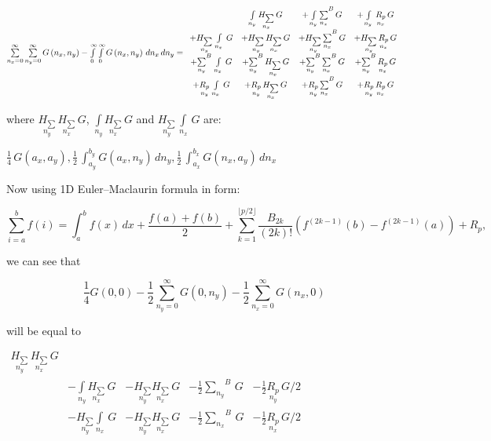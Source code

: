 \documentclass[11pt]{article}
\begin{document}
\(\sum\limits_{n_x=0}^{\infty} \sum\limits_{n_y=0}^{\infty} G\left(n_x, n_y\right) -\int\limits_{0}^{\infty} \int\limits_{0}^{\infty} G\left(n_x, n_y\right)\,d{n_x}\,d{n_y} = \\ \begin{array}{cccc}  \, &  \int\limits_{n_y}^{} \underset{n_x}{H_{\sum}}\,G &  + \int\limits_{n_y}^{}{\sum\limits_{n_x}^{}}^{B}\,G &  + \int\limits_{n_y}^{}\,\underset{n_x}{R_{p}}\,G \\  +\underset{n_y}{H_{\sum}}\,\int\limits_{n_x}^{}\,G &  + \underset{n_y}{H_{\sum}}\,\underset{n_x}{H_{\sum}}\,G &  + \underset{n_y}{H_{\sum}}\,{\sum\limits_{n_x}^{}}^{B}\,G &  + \underset{n_y}{H_{\sum}}\,\underset{n_x}{R_{p}}\,G \\  + {\sum\limits_{n_y}^{}}^{B}\,\int\limits_{n_x}^{}\,G &  + {\sum\limits_{n_y}^{}}^{B}\,\underset{n_x}{H_{\sum}}\,G &  + {\sum\limits_{n_y}^{}}^{B}\,{\sum\limits_{n_x}^{}}^{B}\,G &  + {\sum\limits_{n_y}^{}}^{B}\,\underset{n_x}{R_{p}}\,G \\  + \underset{n_y}{R_{p}}\,\int\limits_{n_x}^{}\,G &  + \underset{n_y}{R_{p}}\,\underset{n_x}{H_{\sum}}\,G &  + \underset{n_y}{R_{p}}\,{\sum\limits_{n_x}^{}}^{B}\,G &  + \underset{n_y}{R_{p}}\,\underset{n_x}{R_{p}}\,G \end{array}\)

    where \(\underset{n_y}{H_{\sum}}\,\underset{n_x}{H_{\sum}}\,G\),
\(\int\limits_{n_y}^{} \underset{n_x}{H_{\sum}}\,G\) and
\(\underset{n_y}{H_{\sum}}\,\int\limits_{n_x}^{}\,G\) are:

    \(\frac{1}{4} \, G\left(a_{x}, a_{y}\right) , \frac{1}{2} \, \int_{a_{y}}^{b_{y}} G\left(a_{x}, n_{y}\right)\,{d n_{y}} , \frac{1}{2} \, \int_{a_{x}}^{b_{x}} G\left(n_{x}, a_{y}\right)\,{d n_{x}}\)

    Now using 1D Euler--Maclaurin formula in form:

    \[{\displaystyle \sum _{i=a}^{b}f(i)=\int _{a}^{b}f(x)\,dx+{\frac {f(a)+f(b)}{2}}+\sum _{k=1}^{\lfloor p/2\rfloor }{\frac {B_{2k}}{(2k)!}}(f^{(2k-1)}(b)-f^{(2k-1)}(a))+R_{p},}\]

    we can see that

    \[
\frac{1}{4}G\left(0, 0\right)
- \frac{1}{2}\sum\limits_{n_y=0}^{\infty}{G\left(0, n_y\right)}
- \frac{1}{2}\sum\limits_{n_x=0}^{\infty}{G\left(n_x, 0\right)}
\]

    will be equal to

    \(\begin{array}{rrllll}  \underset{n_y}{H_{\sum}}\,\underset{n_x}{H_{\sum}}\,G \\  \, &  - \int\limits_{n_y}^{} \underset{n_x}{H_{\sum}}\,G &  - \underset{n_y}{H_{\sum}} \underset{n_x}{H_{\sum}}\,G &  - \frac{1}{2}{\sum\limits_{n_y}^{}}^{B}\,G &  - \frac{1}{2}\underset{n_y}{R_{p}}\,G/2 \\  \,&  - \underset{n_y}{H_{\sum}}\int\limits_{n_x}^{} \,G &  - \underset{n_y}{H_{\sum}} \underset{n_x}{H_{\sum}}\,G &  - \frac{1}{2}{\sum\limits_{n_x}^{}}^{B}\,G &  - \frac{1}{2}\underset{n_x}{R_{p}}\,G/2 \\ \end{array}\)
\end{document}
